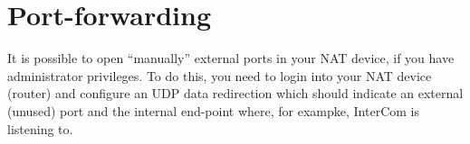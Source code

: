 \section{Port-forwarding}

It is possible to open ``manually'' external ports in your NAT device,
if you have administrator privileges. To do this, you need to login
into your NAT device (router) and configure an UDP data redirection
which should indicate an external (unused) port and the internal
end-point where, for exampke, InterCom is listening to.

